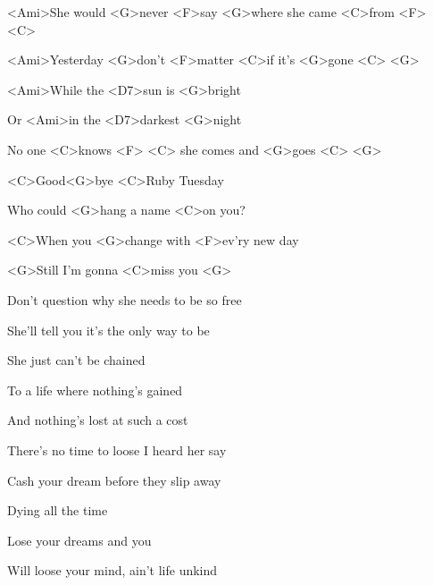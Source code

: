 

\zs
<Ami>She would <G>never <F>say <G>where she came <C>from <F> <C>

<Ami>Yesterday <G>don't <F>matter <C>if it's <G>gone <C> <G>

<Ami>While the <D7>sun is <G>bright

Or <Ami>in the <D7>darkest <G>night

No one <C>knows <F> <C> she comes and <G>goes <C> <G>
\ks

\zr
<C>Good<G>bye <C>Ruby Tuesday

Who could <G>hang a name <C>on you?

<C>When you <G>change with <F>ev'ry new day

<G>Still I'm gonna <C>miss you <G>
\kr

\zs
Don't question why she needs to be so free

She'll tell you it's the only way to be

She just can't be chained

To a life where nothing's gained

And nothing's lost at such a cost
\ks

\zr \kr

\zs
There's no time to loose I heard her say

Cash your dream before they slip away

Dying all the time

Lose your dreams and you

Will loose your mind, ain't life unkind
\ks

\kp

